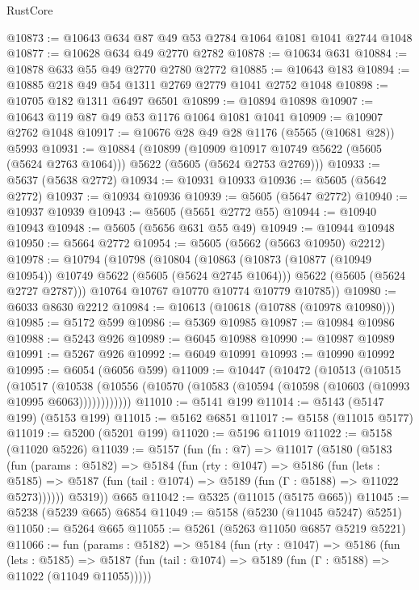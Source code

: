 \begin{lexlean}{RustCore}
\begin{coremodule}
@10873 := @10643 @634 @87 @49 @53 @2784 @1064 @1081 @1041 @2744 @1048
@10877 := @10628 @634 @49 @2770 @2782
@10878 := @10634 @631
@10884 := @10878 @633 @55 @49 @2770 @2780 @2772
@10885 := @10643 @183
@10894 := @10885 @218 @49 @54 @1311 @2769 @2779 @1041 @2752 @1048
@10898 := @10705 @182 @1311 @6497 @6501
@10899 := @10894 @10898
@10907 := @10643 @119 @87 @49 @53 @1176 @1064 @1081 @1041
@10909 := @10907 @2762 @1048
@10917 := @10676 @28 @49 @28 @1176 (@5565 (@10681 @28)) @5993
@10931 := @10884
    (@10899
      (@10909 @10917 @10749 @5622 (@5605 (@5624 @2763 @1064)))
      @5622
      (@5605 (@5624 @2753 @2769)))
@10933 := @5637 (@5638 @2772)
@10934 := @10931 @10933
@10936 := @5605 (@5642 @2772)
@10937 := @10934 @10936
@10939 := @5605 (@5647 @2772)
@10940 := @10937 @10939
@10943 := @5605 (@5651 @2772 @55)
@10944 := @10940 @10943
@10948 := @5605 (@5656 @631 @55 @49)
@10949 := @10944 @10948
@10950 := @5664 @2772
@10954 := @5605 (@5662 (@5663 @10950) @2212)
@10978 := @10794
    (@10798
      (@10804
        (@10863
          (@10873 (@10877 (@10949 @10954)) @10749 @5622 (@5605 (@5624 @2745 @1064)))
          @5622
          (@5605 (@5624 @2727 @2787)))
        @10764
        @10767
        @10770
        @10774
        @10779
        @10785))
@10980 := @6033 @8630 @2212
@10984 := @10613 (@10618 (@10788 (@10978 @10980)))
@10985 := @5172 @599
@10986 := @5369 @10985
@10987 := @10984 @10986
@10988 := @5243 @926
@10989 := @6045 @10988
@10990 := @10987 @10989
@10991 := @5267 @926
@10992 := @6049 @10991
@10993 := @10990 @10992
@10995 := @6054 (@6056 @599)
@11009 := @10447
    (@10472
      (@10513
        (@10515
          (@10517
            (@10538 (@10556 (@10570 (@10583 (@10594 (@10598 (@10603 (@10993 @10995 @6063))))))))))))
@11010 := @5141 @199
@11014 := @5143 (@5147 @199) (@5153 @199)
@11015 := @5162 @6851
@11017 := @5158 (@11015 @5177)
@11019 := @5200 (@5201 @199)
@11020 := @5196 @11019
@11022 := @5158 (@11020 @5226)
@11039 := @5157
    (fun (fn : @7) =>
    @11017
      (@5180
        (@5183
          (fun (params : @5182) =>
          @5184
            (fun (rty : @1047) =>
            @5186
              (fun (lets : @5185) =>
              @5187 (fun (tail : @1074) => @5189 (fun (Γ : @5188) => @11022 @5273))))))
        @5319))
    @665
@11042 := @5325 (@11015 (@5175 @665))
@11045 := @5238 (@5239 @665) @6854
@11049 := @5158 (@5230 (@11045 @5247) @5251)
@11050 := @5264 @665
@11055 := @5261 (@5263 @11050 @6857 @5219 @5221)
@11066 := fun (params : @5182) =>
  @5184
    (fun (rty : @1047) =>
    @5186
      (fun (lets : @5185) =>
      @5187 (fun (tail : @1074) => @5189 (fun (Γ : @5188) => @11022 (@11049 @11055)))))

\end{coremodule}
\end{lexlean}
